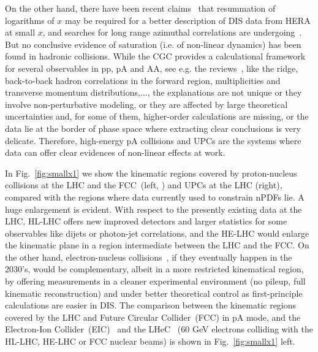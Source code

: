 \documentclass[../report.tex]{subfiles}
\begin{document}
On the other hand, there have been recent claims~\cite{Ball:2017otu,Abdolmaleki:2018jln} that resummation of logarithms of $x$ may be required for a better description of DIS data from HERA at small $x$, and searches for long range azimuthal correlations are undergoing~\cite{zeusichep2018}. 
But no conclusive evidence of saturation (i.e. of non-linear dynamics) has been found in hadronic collisions. While the CGC provides a calculational framework for several observables in pp, pA and AA, see e.g. the reviews~\cite{Albacete:2013tpa,Lappi:2015jka}, like the ridge, back-to-back hadron correlations in the forward region, multiplicities and transverse momentum distributions,$\dots$,  the explanations are not unique or they involve non-perturbative modeling, or they are affected by large theoretical uncertainties and, for some of them, higher-order calculations are missing, or the data lie at the border of phase space where extracting clear conclusions is very delicate. 
Therefore, high-energy pA collisions and UPCs are the systems where data can offer clear evidences of non-linear effects at work.

In Fig.~\ref{fig:smallx1} we show the kinematic regions covered by proton-nucleus collisions at the LHC and the FCC~(left, \cite{Dainese:2016gch}) and UPCs at the LHC (right), compared with the regions where data currently used to constrain nPDFs lie.
A huge enlargement is evident. With respect to the presently existing data at the LHC, HL-LHC offers new improved detectors and larger statistics for some observables like dijets or photon-jet correlations, and the HE-LHC would enlarge the kinematic plane in a region intermediate between the LHC and the FCC. On the other hand, electron-nucleus collisions~\cite{AbelleiraFernandez:2012cc,Accardi:2012qut}, if they eventually happen in the 2030's, would be complementary, albeit in a more restricted kinematical region, by offering measurements in a cleaner experimental environment (no pileup, full kinematic reconstruction) and under better theoretical control as first-principle calculations are easier in DIS. 
The comparison between the kinematic regions covered by the LHC and Future Circular Collider~(FCC) in pA mode, and the Electron-Ion Collider~(EIC)~\cite{Accardi:2012qut} and the LHeC~\cite{AbelleiraFernandez:2012cc} (60 GeV electrons colliding with the HL-LHC, HE-LHC or FCC nuclear beams) is shown in Fig.~\ref{fig:smallx1} left.
\end{document}
